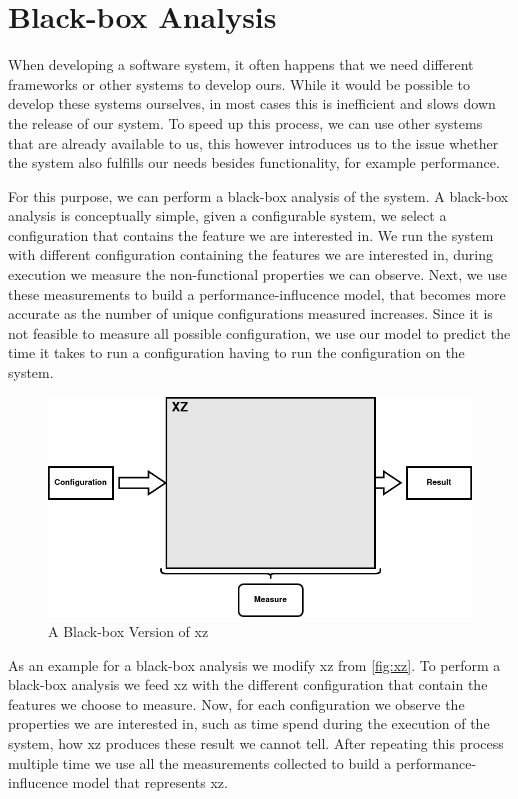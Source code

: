 \section{Black-box Analysis}\label{ch:Blackbox}
When developing a software system, it often happens that we need different frameworks or other systems to develop ours.
While it would be possible to develop these systems ourselves, in most cases this is inefficient and slows down the release of our system.
To speed up this process, we can use other systems that are already available to us, this however introduces us to the issue whether the system 
also fulfills our needs besides functionality, for example performance. 

For this purpose, we can perform a black-box analysis of the system. 
A black-box analysis is conceptually simple, given a configurable system, we select a configuration that contains the feature we are interested in. 
We run the system with different configuration containing the features we are interested in,
during execution we measure the non-functional properties we can observe.
Next, we use these measurements to build a performance-influcence model, that becomes more accurate as the number of unique configurations measured increases. 
Since it is not feasible to measure all possible configuration, we use our model to predict the time it takes to run a configuration
having to run the configuration on the system.


\begin{figure}[h]
    \centering
    \includegraphics[scale=0.6]{gfx/BlackBoxXZ.png}
    \caption{A Black-box Version of xz}
    \label{fig:BBxz}
\end{figure}

As an example for a black-box analysis we modify xz from \ref{fig:xz}. To perform a black-box analysis we feed xz with the different configuration that
contain the features we choose to measure. Now, for each configuration we observe the properties we are interested in, such as time spend during the 
execution of the system, how xz produces these result we cannot tell. After repeating this process multiple time we use all the measurements collected to 
build a performance-influcence model that represents xz.

